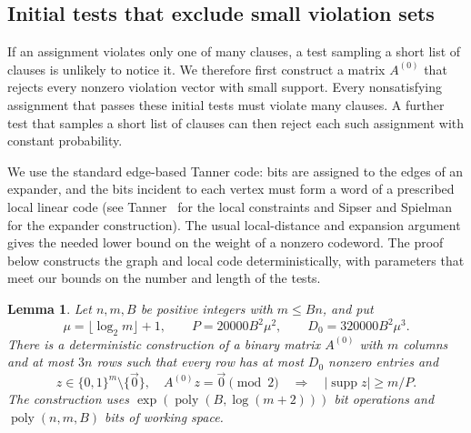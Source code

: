 \documentclass[11pt,reqno]{amsart}
\numberwithin{equation}{section}
\newtheorem{lemma}[theorem]{Lemma}
\theoremstyle{definition}\newtheorem{definition}[theorem]{Definition}
\theoremstyle{remark}\newtheorem{remark}[theorem]{Remark}
\newcommand{\poly}{\operatorname{poly}}
\renewcommand{\le}{\leqslant}
\renewcommand{\ge}{\geqslant}
\begin{document}
\subsection{Initial tests that exclude small violation sets}

If an assignment violates only one of many clauses, a test sampling
a short list of clauses is unlikely to notice it. We therefore first
construct a matrix $A^{(0)}$ that rejects every nonzero violation
vector with small support. Every nonsatisfying assignment that passes
these initial tests must violate many clauses. A further test that
samples a short list of clauses can then reject each such assignment
with constant probability.

We use the standard edge-based Tanner code: bits are assigned to
the edges of an expander, and the bits incident to each vertex
must form a word of a prescribed local linear code
(see
Tanner~\cite[Section~II]{Tanner81} for the local constraints and
Sipser and Spielman~\cite[Sections~IV and~VI]{SS96} for the expander construction).
The usual local-distance and expansion argument gives the needed
lower bound on the weight of a nonzero codeword. The proof below
constructs the graph and local code deterministically, with parameters
that meet our bounds on the number and length of the tests.

\begin{lemma}\label{lem:sparse-checks}
Let $n,m,B$ be positive integers with $m\le Bn$, and put
\[
 \mu=\lfloor\log_2 m\rfloor+1,\qquad
 P=20000B^2\mu^2,\qquad D_0=320000B^2\mu^3.
\]
There is a deterministic construction of a binary matrix
$A^{(0)}$ with $m$ columns and at most $3n$ rows such that every row
has at most $D_0$ nonzero entries and
\[
 z\in\{0,1\}^m\setminus\{\vec{0}\},\quad
 A^{(0)}z=\vec{0}\pmod2
 \quad\Longrightarrow\quad
 |\operatorname{supp}z|\ge m/P.
\]
The construction uses $\exp(\poly(B,\log(m+2)))$
bit operations and $\poly(n,m,B)$ bits of working space.
\end{lemma}
\end{document}
